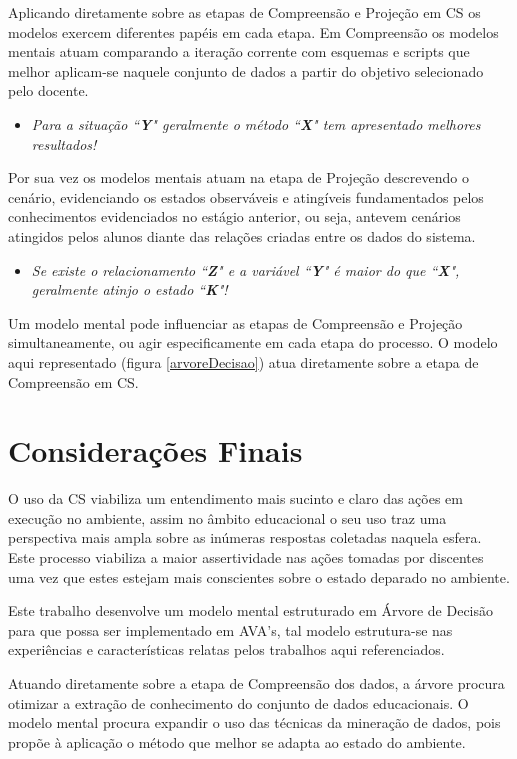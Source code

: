 \documentclass[12pt]{article}
\begin{document}
Aplicando diretamente sobre as etapas de Compreensão e Projeção em CS os modelos exercem diferentes papéis em cada etapa. Em Compreensão os modelos mentais atuam comparando a iteração corrente com esquemas e scripts que melhor aplicam-se naquele conjunto de dados a partir do objetivo selecionado pelo docente.

\begin{itemize}	
	\item \textit{Para a situação ``\textbf{Y}" geralmente o método ``\textbf{X}" tem apresentado melhores resultados!}
\end{itemize}

Por sua vez os modelos mentais atuam na etapa de Projeção descrevendo o cenário, evidenciando os estados observáveis e atingíveis fundamentados pelos conhecimentos evidenciados no estágio anterior, ou seja, antevem cenários atingidos pelos alunos diante das relações criadas entre os dados do sistema.

\begin{itemize}	
	\item \textit{Se existe o relacionamento ``\textbf{Z}" e a variável ``\textbf{Y}" é maior do que ``\textbf{X}", geralmente atinjo o estado ``\textbf{K}"!}
\end{itemize}

Um modelo mental pode influenciar as etapas de Compreensão e Projeção simultaneamente, ou agir especificamente em cada etapa do processo. O modelo aqui representado (figura \ref{arvoreDecisao}) atua diretamente sobre a etapa de Compreensão em CS.


\section{Considerações Finais}

O uso da CS viabiliza um entendimento mais sucinto e claro das ações em execução no ambiente, assim no âmbito educacional o seu uso traz uma perspectiva mais ampla sobre as inúmeras respostas coletadas naquela esfera. Este processo viabiliza a maior assertividade nas ações tomadas por discentes uma vez que estes estejam mais conscientes sobre o estado deparado no ambiente.

Este trabalho desenvolve um modelo mental estruturado em Árvore de Decisão para que possa ser implementado em AVA's, tal modelo estrutura-se nas experiências e características relatas pelos trabalhos aqui referenciados. 

Atuando diretamente sobre a etapa de Compreensão dos dados, a árvore procura otimizar a extração de conhecimento do conjunto de dados educacionais. O modelo mental procura expandir o uso das técnicas da mineração de dados, pois propõe à aplicação o método que melhor se adapta ao estado do ambiente.
\end{document}
